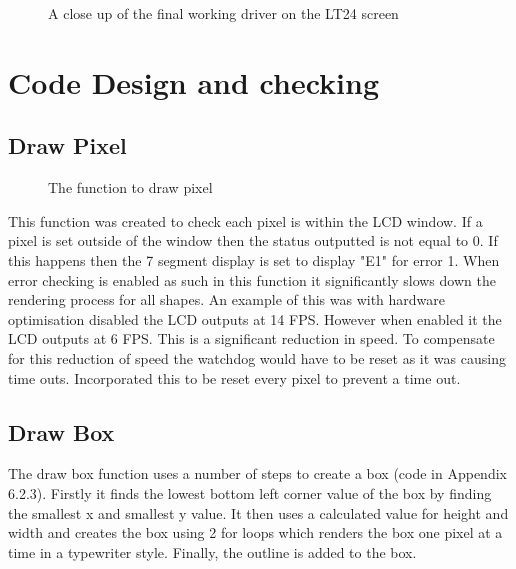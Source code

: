 \documentclass[a4paper,12pt]{article}
\newcommand{\GraphicsC}{../Graphics/Graphics.c}
\begin{document}
\begin{figure}[h]
	\centering
	\caption{A close up of the final working driver on the LT24 screen}
\end{figure}
\newpage
\section{Code Design and checking}
\subsection{Draw Pixel}
\begin{figure}[h]
	\centering
	\setlength{\belowcaptionskip}{-15pt}
	
	\caption{The function to draw pixel}
\end{figure}
\begin{flushleft}
This function was created to check each pixel is within the LCD window. If a pixel is set outside of the window then the status outputted is not equal to 0. If this happens then the 7 segment display is set to display "E1" for error 1. When error checking is enabled as such in this function it significantly slows down the rendering process for all shapes. An example of this was with hardware optimisation disabled the LCD outputs at 14 FPS. However when enabled it the LCD outputs at 6 FPS. This is a significant reduction in speed. To compensate for this reduction of speed the watchdog would have to be reset as it was causing time outs. Incorporated this to be reset every pixel to prevent a time out.
\end{flushleft}
\subsection{Draw Box}
\begin{flushleft}
The draw box function uses a number of steps to create a box (code in Appendix 6.2.3). Firstly it finds the lowest bottom left corner value of the box by finding the smallest x and smallest y value. It then uses a calculated value for height and width and creates the box using 2 for loops which renders the box one pixel at a time in a typewriter style. Finally, the outline is added to the box.
\end{flushleft}
\end{document}
